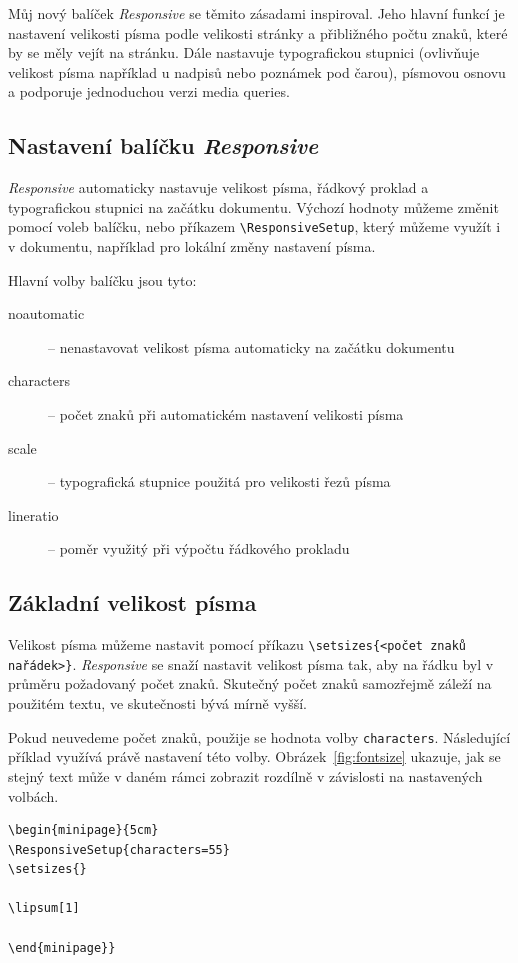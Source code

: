 \documentclass{csbulletin}
\newcommand\balicek[1]{\textit{#1}}
\begin{document}
Můj nový balíček \balicek{Responsive} se těmito zásadami inspiroval. 
Jeho hlavní funkcí je nastavení velikosti písma podle velikosti stránky
a přibližného počtu znaků, které by se měly vejít na stránku. 
Dále nastavuje typografickou stupnici (ovlivňuje velikost písma například 
u nadpisů nebo poznámek pod čarou), písmovou osnovu a podporuje
jednoduchou verzi media queries.

\subsection{Nastavení balíčku \balicek{Responsive}}

\balicek{Responsive} automaticky nastavuje velikost písma, řádkový proklad
a typografickou stupnici na začátku dokumentu. Výchozí hodnoty můžeme změnit
pomocí voleb balíčku, nebo příkazem \verb|\ResponsiveSetup|, který můžeme 
využít i v dokumentu, například pro lokální změny nastavení písma. 

Hlavní volby balíčku jsou tyto:

\begin{description}
  \item[noautomatic] – nenastavovat velikost písma automaticky na začátku dokumentu
  \item[characters] – počet znaků při automatickém nastavení velikosti písma
  \item[scale] –  typografická stupnice použitá pro velikosti řezů písma
  \item[lineratio] – poměr využitý při výpočtu řádkového prokladu
\end{description}

\subsection{Základní velikost písma}

Velikost písma můžeme nastavit pomocí příkazu \verb|\setsizes{<počet znaků na|\allowbreak\verb|řádek>}|. 
\balicek{Responsive} se snaží nastavit velikost písma tak, aby na řádku byl v průměru
požadovaný počet znaků. Skutečný počet znaků samozřejmě záleží na použitém textu, ve 
skutečnosti bývá mírně vyšší.

Pokud neuvedeme počet znaků, použije se hodnota volby \texttt{characters}.
Následující příklad využívá právě nastavení této volby. Obrázek~\ref{fig:fontsize} 
ukazuje, jak se stejný text může v daném rámci zobrazit rozdílně v závislosti na
nastavených volbách.

\begin{verbatim}
\begin{minipage}{5cm}
\ResponsiveSetup{characters=55}
\setsizes{}

\lipsum[1]

\end{minipage}}
\end{verbatim}
\end{document}
